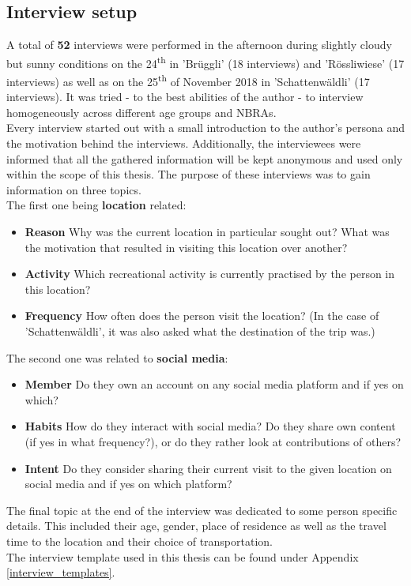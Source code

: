 \subsection{Interview setup} \label{interview_setup}
A total of \textbf{52} interviews were performed in the afternoon during slightly cloudy but sunny conditions on the 24\textsuperscript{th} in 'Br\"uggli' (18 interviews) and 'R\"ossliwiese' (17 interviews) as well as on the 25\textsuperscript{th} of November 2018 in 'Schattenw\"aldli' (17 interviews). It was tried - to the best abilities of the author - to interview homogeneously across different age groups and NBRAs.\\
Every interview started out with a small introduction to the author's persona and the motivation behind the interviews. Additionally, the interviewees were informed that all the gathered information will be kept anonymous and used only within the scope of this thesis. The purpose of these interviews was to gain information on three topics.\\
\newline
The first one being \textbf{location} related:
\begin{itemize}[label={}]
    \item \textbf{Reason} Why was the current location in particular sought out? What was the motivation that resulted in visiting this location over another?
    \item \textbf{Activity} Which recreational activity is currently practised by the person in this location?
    \item \textbf{Frequency} How often does the person visit the location? (In the case of 'Schattenw\"aldli', it was also asked what the destination of the trip was.)
\end{itemize}

The second one was related to \textbf{social media}:
\begin{itemize}[label={}]
    \item \textbf{Member} Do they own an account on any social media platform and if yes on which?
    \item \textbf{Habits} How do they interact with social media? Do they share own content (if yes in what frequency?), or do they rather look at contributions of others?
    \item \textbf{Intent} Do they consider sharing their current visit to the given location on social media and if yes on which platform?
\end{itemize}
The final topic at the end of the interview was dedicated to some person specific details. This included their age, gender, place of residence as well as the travel time to the location and their choice of transportation.\\
The interview template used in this thesis can be found under Appendix \ref{interview_templates}.

